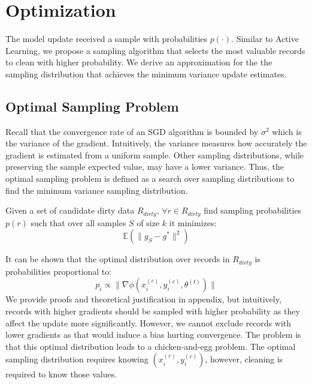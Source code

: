\section{Optimization}\label{dist-samp}
The model update received a sample with probabilities $p(\cdot)$.
Similar to Active Learning, we propose a sampling algorithm that selects the most valuable records to clean with higher probability.
We derive an approximation for the the sampling distribution that achieves the minimum variance update estimates. 

\subsection{Optimal Sampling Problem}
Recall that the convergence rate of an SGD algorithm is bounded by $\sigma^2$ which is the variance of the gradient.
Intuitively, the variance measures how accurately the gradient is estimated from a uniform sample.
Other sampling distributions, while preserving the sample expected value, may have a lower variance.
Thus, the optimal sampling problem is defined as a search over sampling distributions to find the minimum variance sampling distribution.

\begin{definition}
Given a set of candidate dirty data $R_{dirty}$, $\forall r \in R_{dirty}$ find sampling probabilities $p(r)$ such that over all samples $S$ of size $k$ it minimizes:
\[
\mathbb{E}(\|g_S - g^*\|^2)
\]
\end{definition}
It can be shown that the optimal distribution over records in $R_{dirty}$ is probabilities proportional to:
\[
p_i \propto \|\nabla\phi(x^{(c)}_i,y^{(c)}_i,\theta^{(t)})\|
\]
We provide proofs and theoretical justification in appendix, but intuitively, records with higher gradients should be sampled with higher probability as they affect the update more significantly.
However, we cannot exclude records with lower gradients as that would induce a bias hurting convergence.
The problem is that this optimal distribution leads to a chicken-and-egg problem.
The optimal sampling distribution requires knowing $(x^{(c)}_i,y^{(c)}_i)$, however, cleaning is required to know those values.